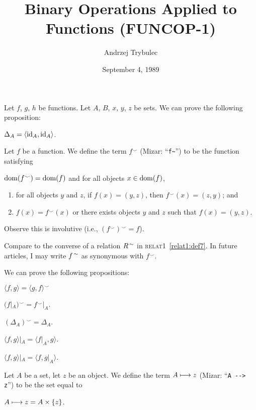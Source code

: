 \documentclass{article}
\title{Binary Operations Applied to Functions (FUNCOP-1)}
\author{Andrzej Trybulec}
\date{September 4, 1989}
\begin{document}
\maketitle

Let $f$, $g$, $h$ be functions. Let $A$, $B$, $x$, $y$, $z$ be sets.
We can prove the following proposition:
\begin{thm}
\item\label{funcop1:1} $\Delta_{A}=\langle\operatorname{id}_{A},\operatorname{id}_{A}\rangle$.
\end{thm}

\begin{definition}
Let $f$ be a function.
We define the term $f^{\smile}$ (Mizar: ``\verb#f~#'') to be the function satisfying
\begin{defn}
\item $\operatorname{dom}(f^{\smile})=\operatorname{dom}(f)$ and for all objects $x\in\operatorname{dom}(f)$,
  \begin{enumerate}[label=(\roman*)]
  \item for all objects $y$ and $z$, if $f(x)=(y,z)$, then $f^{\smile}(x)=(z,y)$;
    and
  \item $f(x)=f^{\smile}(x)$ or there exists objects $y$ and $z$ such
    that $f(x)=(y,z)$.
  \end{enumerate}
\end{defn}
Observe this is involutive (i.e., $(f^{\smile})^{\smile}=f$).
\end{definition}

\begin{remark}
Compare to the converse of a relation $R^{\,\sim}$ in \textsc{relat1}~\ref{relat1:def7}.
In future articles, I may write $f^{\,\sim}$ as synonymous with $f^{\smile}$.
\end{remark}

We can prove the following propositions:
\begin{thm}
\item\label{funcop1:2} $\langle f,g\rangle=\langle g,f\rangle^{\smile}$
\item\label{funcop1:3} $(f|_{A})^{\smile}=f^{\smile}|_{A}$.
\item\label{funcop1:4} $(\Delta_{A})^{\smile}=\Delta_{A}$.
\item\label{funcop1:5} $\langle f,g\rangle|_{A}=\langle f|_{A},g\rangle$.
\item\label{funcop1:6} $\langle f,g\rangle|_{A}=\langle f,g|_{A}\rangle$.
\end{thm}

\begin{definition}%
Let $A$ be a set, let $z$ be an object.
We define the term $A\longmapsto z$ (Mizar: ``\verb#A --> z#'')
to be the set equal to
\begin{defn}
\item $A\longmapsto z= A\times\{z\}$.
\end{defn}
\end{definition}
\end{document}
